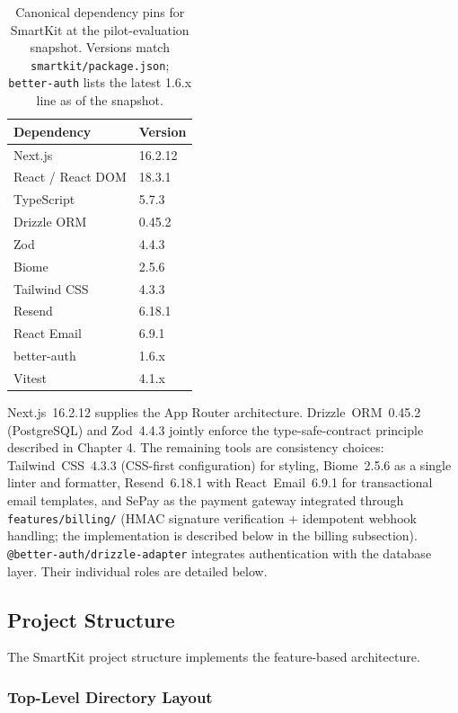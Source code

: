 \documentclass[12pt,a4paper]{report}
\newcommand{\pkg}[1]{\texttt{\nolinkurl{#1}}}
\DeclareRobustCommand{\filename}[1]{\bgroup\urlstyle{tt}\nolinkurl{#1}\egroup}
\begin{document}
\begin{table}[H]
  \centering
  \small
  \caption{Canonical dependency pins for SmartKit at the pilot-evaluation snapshot. Versions match \filename{smartkit/package.json}; \pkg{better-auth} lists the latest 1.6.x line as of the snapshot.}
  \label{tbl:dependency-pins}
  \begin{tabular}{ll}
    \hline
    \textbf{Dependency} & \textbf{Version} \\
    \hline
    Next.js & 16.2.12 \\
    React / React DOM & 18.3.1 \\
    TypeScript & 5.7.3 \\
    Drizzle ORM & 0.45.2 \\
    Zod & 4.4.3 \\
    Biome & 2.5.6 \\
    Tailwind CSS & 4.3.3 \\
    Resend & 6.18.1 \\
    React Email & 6.9.1 \\
    better-auth & 1.6.x \\
    Vitest & 4.1.x \\
    \hline
  \end{tabular}
\end{table}

Next.js~16.2.12 supplies the App Router architecture. Drizzle~ORM~0.45.2 (PostgreSQL) and Zod~4.4.3 jointly enforce the type-safe-contract principle described in Chapter 4. The remaining tools are consistency choices: Tailwind~CSS~4.3.3 (CSS-first configuration) for styling, Biome~2.5.6 as a single linter and formatter, Resend~6.18.1 with React~Email~6.9.1 for transactional email templates, and SePay as the payment gateway integrated through \filename{features/billing/} (HMAC signature verification + idempotent webhook handling; the implementation is described below in the billing subsection). \pkg{@better-auth/drizzle-adapter} integrates authentication with the database layer. Their individual roles are detailed below.

\subsection{Project Structure}
\label{sec:project-structure}

The SmartKit project structure implements the feature-based architecture.

\subsubsection{Top-Level Directory Layout}
\label{sec:top-level-layout}
\end{document}
